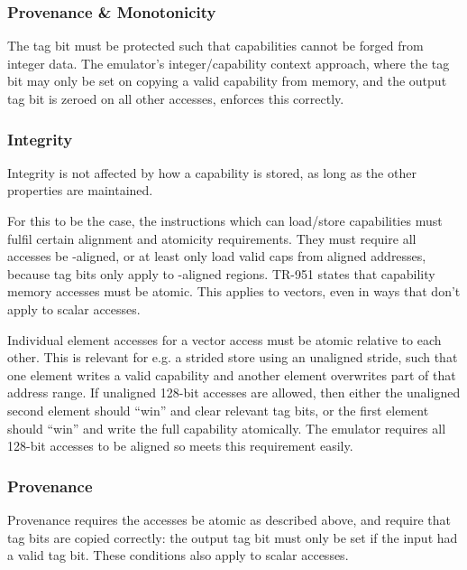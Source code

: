 \subsubsection*{Provenance \& Monotonicity}
The tag bit must be protected such that capabilities cannot be forged from integer data.
The emulator's integer/capability context approach, where the tag bit may only be set on copying a valid capability from memory, and the output tag bit is zeroed on all other accesses, enforces this correctly.

\subsubsection*{Integrity}
Integrity is not affected by how a capability is stored, as long as the other properties are maintained.

\pagebreak
{}\label{chap:capinvec:hyp_load_store}
For this to be the case, the instructions which can load/store capabilities must fulfil certain alignment and atomicity requirements.
They must require all accesses be -aligned, or at least only load valid caps from aligned addresses, because tag bits only apply to -aligned regions.
TR-951 states that capability memory accesses must be atomic\cite[Section 11.3]{TR-951}.
This applies to vectors, even in ways that don't apply to scalar accesses.

Individual element accesses for a vector access must be atomic relative to each other.
This is relevant for e.g. a strided store using an unaligned stride, such that one element writes a valid capability and another element overwrites part of that address range.
If unaligned 128-bit accesses are allowed, then either the unaligned second element should ``win'' and clear relevant tag bits, or the first element should ``win'' and write the full capability atomically.
The emulator requires all 128-bit accesses to be aligned so meets this requirement easily.

\subsubsection*{Provenance}
Provenance requires the accesses be atomic as described above, and require that tag bits are copied correctly: the output tag bit must only be set if the input had a valid tag bit.
These conditions also apply to scalar accesses.

